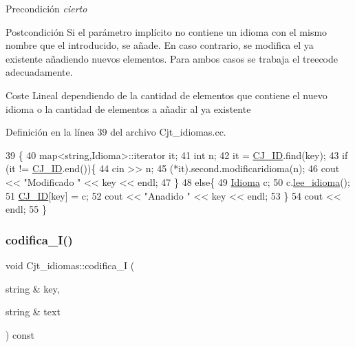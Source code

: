 \begin{DoxyPrecond}{Precondición}
{\itshape cierto} 
\end{DoxyPrecond}
\begin{DoxyPostcond}{Postcondición}
Si el parámetro implícito no contiene un idioma con el mismo nombre que el introducido, se añade. En caso contrario, se modifica el ya existente añadiendo nuevos elementos. Para ambos casos se trabaja el treecode adecuadamente. 
\end{DoxyPostcond}
\begin{DoxyParagraph}{Coste}
Lineal dependiendo de la cantidad de elementos que contiene el nuevo idioma o la cantidad de elementos a añadir al ya existente 
\end{DoxyParagraph}


Definición en la línea 39 del archivo Cjt\+\_\+idiomas.\+cc.


\begin{DoxyCode}
39                                                \{
40   map<string,Idioma>::iterator it;
41   \textcolor{keywordtype}{int} n;
42   it = \hyperlink{class_cjt__idiomas_aeb67a7100b1345a160fb85466bd4e5f6}{CJ\_ID}.find(key);
43   \textcolor{keywordflow}{if} (it != \hyperlink{class_cjt__idiomas_aeb67a7100b1345a160fb85466bd4e5f6}{CJ\_ID}.end())\{
44     cin >> n;
45     (*it).second.modificaridioma(n);
46     cout << \textcolor{stringliteral}{"Modificado "} << key << endl;
47   \}
48   \textcolor{keywordflow}{else}\{
49     \hyperlink{class_idioma}{Idioma} c;
50     c.\hyperlink{class_idioma_a0a4599da90aef15aa798a63ee6ad820e}{lee\_idioma}();
51     \hyperlink{class_cjt__idiomas_aeb67a7100b1345a160fb85466bd4e5f6}{CJ\_ID}[key] = c;
52     cout << \textcolor{stringliteral}{"Anadido "} << key << endl;
53   \}
54   cout << endl;
55 \}
\end{DoxyCode}
\mbox{\label{class_cjt__idiomas_af3724a3343435acc48397c555722ce2f}} 
\subsubsection{\texorpdfstring{codifica\+\_\+\+I()}{codifica\_I()}}
{\footnotesize\ttfamily void Cjt\+\_\+idiomas\+::codifica\+\_\+I (\begin{DoxyParamCaption}\item[{string \&}]{key,  }\item[{string \&}]{text }\end{DoxyParamCaption}) const}



